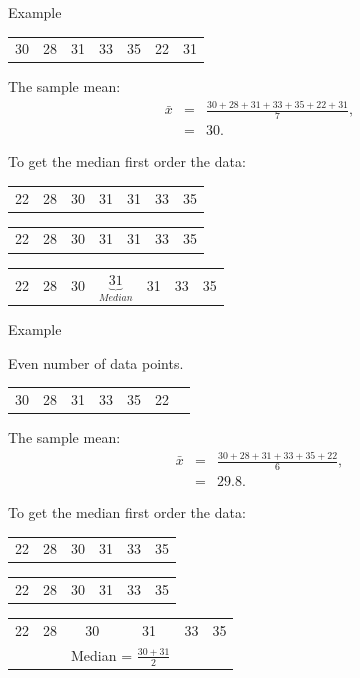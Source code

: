 \begin{frame}{Example}

  \begin{tabular}{lllllll}
    30 & 28 & 31 & 33 & 35 & 22 & 31
  \end{tabular}

  The sample mean:
  \begin{eqnarray*}
    \bar{x} & = & \frac{30 + 28 + 31 + 33 + 35 + 22 + 31}{7}, \\
    & = & 30.
  \end{eqnarray*}

  To get the median first order the data: \\
  {
    \begin{tabular}{lllllll}
      22 & 28 & 30 & 31 & 31 & 33 & 35
    \end{tabular}
  }

  {
    \begin{tabular}{lllllll}
      {\color{red}22} & {\color{red}28} & {\color{red}30} & 31 & {\color{blue}31} & {\color{blue}33} & {\color{blue}35}
    \end{tabular}
  }

  {
    \begin{tabular}{lllllll}
      {\color{red}22} & {\color{red}28} & {\color{red}30} & $\underbrace{31}_{Median}$ & {\color{blue}31} & {\color{blue}33} & {\color{blue}35}
    \end{tabular}
  }
  
\end{frame}


\begin{frame}{Example}

  Even number of data points.

  \begin{tabular}{lllllll}
    30 & 28 & 31 & 33 & 35 & 22 
  \end{tabular}

  The sample mean:
  \begin{eqnarray*}
    \bar{x} & = & \frac{30 + 28 + 31 + 33 + 35 + 22}{6}, \\
    & = & 29.8.
  \end{eqnarray*}

  To get the median first order the data: \\
  {
    \begin{tabular}{llllll}
      22 & 28 & 30 & 31 & 33 & 35
    \end{tabular}
  }

  {
    \begin{tabular}{llllll}
      {\color{red}22} & {\color{red}28} & 30 & 31  & {\color{blue}33} & {\color{blue}35}
    \end{tabular}
  }

  {
    \begin{tabular}{llccll}
      {\color{red}22} & {\color{red}28} & 30 & 31 & 
      {\color{blue}33} & {\color{blue}35} \\
      & & \multicolumn{2}{c}{Median = $\frac{30+31}{2}$} 
    \end{tabular}
  }
  
\end{frame}


